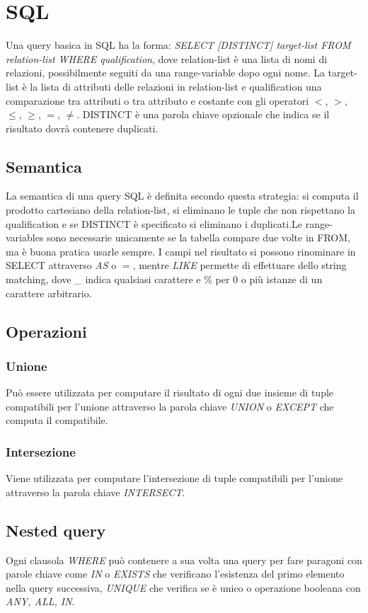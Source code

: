 \chapter{SQL}
Una query basica in SQL ha la forma: \emph{SELECT [DISTINCT] target-list FROM relation-list WHERE qualification}, dove relation-list \`e una lista di nomi
di relazioni, possibilmente seguiti da una range-variable dopo ogni nome. La target-list \`e la lista di attributi delle relazioni in relation-list e 
qualification una comparazione tra attributi o tra attributo e costante con gli operatori $<$, $>$, $\le$, $\ge$, $=$, $\neq$. DISTINCT \`e una parola chiave
opzionale che indica se il risultato dovr\`a contenere duplicati. 
\section{Semantica}
La semantica di una query SQL \`e definita secondo questa strategia: si computa il prodotto cartesiano della relation-list, si eliminano le tuple che non 
rispettano la qualification e se DISTINCT \`e specificato si eliminano i duplicati.Le range-variables sono necessarie unicamente se la tabella compare due 
volte in FROM, ma \`e buona pratica usarle sempre. I campi nel risultato si possono rinominare in SELECT attraverso \emph{AS} o $=$, mentre \emph{LIKE} 
permette di effettuare dello string matching, dove \_ indica qualsiasi carattere e $\%$ per $0$ o pi\`u istanze di un carattere arbitrario. 
\section{Operazioni}
\subsection{Unione}
Pu\`o essere utilizzata per computare il risultato di ogni due insieme di tuple compatibili per l'unione attraverso la parola chiave \emph{UNION} o 
\emph{EXCEPT} che computa il compatibile.
\subsection{Intersezione}
Viene utilizzata per computare l'intersezione di tuple compatibili per l'unione attraverso la parola chiave \emph{INTERSECT}.
\section{Nested query}
Ogni clausola \emph{WHERE} pu\`o contenere a sua volta una query per fare paragoni con parole chiave come \emph{IN} o \emph{EXISTS} che verificano 
l'esistenza del primo elemento nella query successiva, \emph{UNIQUE} che verifica se \`e unico o operazione booleana con \emph{ANY, ALL, IN}. 
